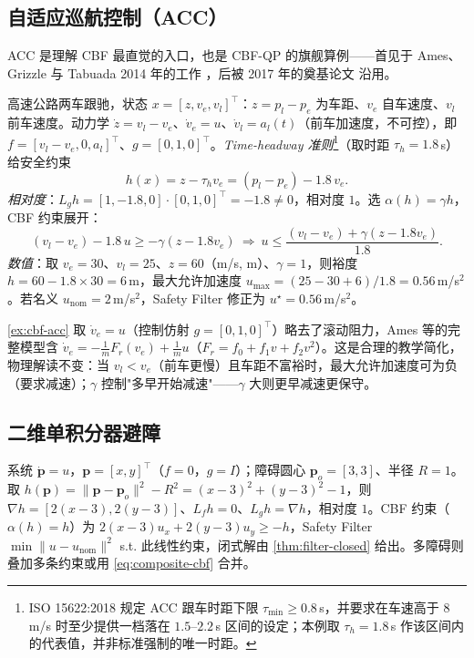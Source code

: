\subsection{自适应巡航控制（ACC）}
\label{sec:cbf-acc}

ACC 是理解 CBF 最直觉的入口，也是 CBF-QP 的旗舰算例——首见于 Ames、Grizzle 与 Tabuada 2014 年的工作 \cite{ames2014cbfacc}，后被 2017 年的奠基论文 \cite{ames2017cbf} 沿用。

\begin{example}\label{ex:cbf-acc}
高速公路两车跟驰，状态 $x=[z,v_e,v_l]^\top$：$z=p_l-p_e$ 为车距、$v_e$ 自车速度、$v_l$ 前车速度。动力学 $\dot z=v_l-v_e$、$\dot v_e=u$、$\dot v_l=a_l(t)$（前车加速度，不可控），即 $f=[v_l-v_e,0,a_l]^\top$、$g=[0,1,0]^\top$。\emph{Time-headway 准则}\footnote{ISO 15622:2018 规定 ACC 跟车时距下限 $\tau_{\min}\ge0.8$\,s，并要求在车速高于 $8$\,m/s 时至少提供一档落在 $1.5$–$2.2$\,s 区间的设定；本例取 $\tau_h=1.8$\,s 作该区间内的代表值，并非标准强制的唯一时距。}（取时距 $\tau_h=1.8$\,s）给安全约束
\[
h(x)=z-\tau_h v_e=(p_l-p_e)-1.8\,v_e.
\]
\emph{相对度}：$L_gh=[1,-1.8,0]\cdot[0,1,0]^\top=-1.8\neq0$，相对度 $1$。选 $\alpha(h)=\gamma h$，CBF 约束展开：
\[
(v_l-v_e)-1.8\,u\ge-\gamma(z-1.8v_e)\ \Longrightarrow\ u\le\frac{(v_l-v_e)+\gamma(z-1.8v_e)}{1.8}.
\]
\emph{数值}：取 $v_e=30$、$v_l=25$、$z=60$（m/s, m）、$\gamma=1$，则裕度 $h=60-1.8\times30=6$\,m，最大允许加速度 $u_{\max}=(25-30+6)/1.8=0.56$\,m/s$^2$。若名义 $u_{\mathrm{nom}}=2$\,m/s$^2$，Safety Filter 修正为 $u^\star=0.56$\,m/s$^2$。
\end{example}

\begin{note}[教学简化说明]
\cref{ex:cbf-acc} 取 $\dot v_e=u$（控制仿射 $g=[0,1,0]^\top$）略去了滚动阻力，Ames 等的完整模型含 $\dot v_e=-\tfrac1mF_r(v_e)+\tfrac1mu$（$F_r=f_0+f_1v+f_2v^2$）\cite{ames2014cbfacc}。这是合理的教学简化，物理解读不变：当 $v_l<v_e$（前车更慢）且车距不富裕时，最大允许加速度可为负（要求减速）；$\gamma$ 控制"多早开始减速"——$\gamma$ 大则更早减速更保守。
\end{note}

\subsection{二维单积分器避障}

\begin{example}[单积分器避圆障]\label{ex:cbf-avoid}
系统 $\dot{\mathbf p}=u$，$\mathbf p=[x,y]^\top$（$f=0$，$g=I$）；障碍圆心 $\mathbf p_o=[3,3]$、半径 $R=1$。取 $h(\mathbf p)=\|\mathbf p-\mathbf p_o\|^2-R^2=(x-3)^2+(y-3)^2-1$，则 $\nabla h=[2(x-3),2(y-3)]$、$L_fh=0$、$L_gh=\nabla h$，相对度 $1$。CBF 约束（$\alpha(h)=h$）为 $2(x-3)u_x+2(y-3)u_y\ge-h$，Safety Filter $\min\|u-u_{\mathrm{nom}}\|^2$ s.t. 此线性约束，闭式解由 \cref{thm:filter-closed} 给出。多障碍则叠加多条约束或用 \cref{eq:composite-cbf} 合并。
\end{example}

